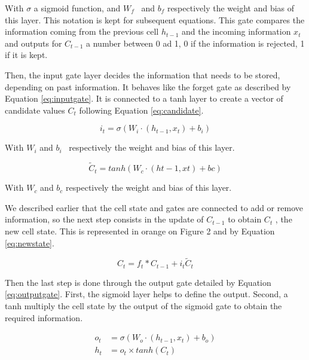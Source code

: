 With  \(  \sigma  \)  a sigmoid function, and  \( W_{f} \) \  and  \( b_{f} \)  respectively the 
weight and bias of this layer. This notation is kept for subsequent equations. This gate compares 
the information coming from the previous cell  \( h_{t-1} \) and the incoming information  \( x_{t} \)  
and outputs for  \( C_{t-1}  \) a number between 0 ad 1, 0 if the information is rejected, 1 if it is kept.

Then, the input gate layer decides the information that needs to be stored, depending on past information. 
It behaves like the forget gate as described by Equation \ref{eq:inputgate}. It is connected to a 
tanh layer to create a vector of candidate values \(  C_{t} \)  following Equation \ref{eq:candidate}.


\begin{equation}\label{eq:inputgate}
 i_{t} = \sigma  \left(W_i \cdot \left( h_{t-1}, x_t \right) + b_i \right)
\end{equation}


With  \( W_{i} \)  and  \( b_{i} \) \  respectively the weight and bias of this layer. 

\begin{equation}\label{eq:candidate}
 \tilde{C}_{t} = tanh \left( W_{c} \cdot  \left( ht-1,xt \right) +bc \right)
\end{equation}


With  \( W_{c} \)  and  \( b_{c} \)  respectively the weight and bias of this layer. 


We described earlier that the cell state and gates are connected to add or remove information, 
so the next step consists in the update of  \( C_{t-1} \) to obtain  \( C_{t} \) , 
the new cell state. This is represented in orange on Figure 2 and by Equation \ref{eq:newstate}. 



\begin{equation}\label{eq:newstate}
 C_{t} = f_{t} \ast C_{t-1} + i_{t}\tilde{C}_{t}
\end{equation}

Then the last step is done through the output gate detailed by Equation \ref{eq:outputgate}. First, the sigmoid layer 
helps to define the output. Second, a tanh multiply the cell state by the output of the sigmoid gate to 
obtain the required information.


\begin{align} \label{eq:outputgate}
	o_t &= \sigma \left( W_{o} \cdot (h_{t-1}, x_t) + b_{o} \right) \\
	h_t &= o_t \times tanh(C_t)
\end{align}

